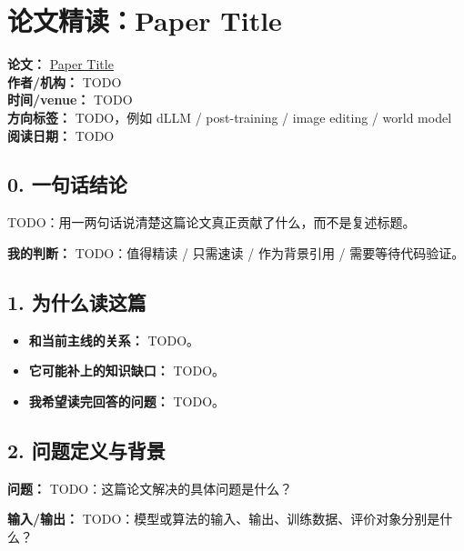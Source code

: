 
\section{论文精读：Paper Title}

\begin{conceptbox}
\textbf{论文：} \href{https://arxiv.org/abs/0000.00000}{Paper Title}\\
\textbf{作者/机构：} TODO\\
\textbf{时间/venue：} TODO\\
\textbf{方向标签：} TODO，例如 dLLM / post-training / image editing / world model\\
\textbf{阅读日期：} TODO
\end{conceptbox}

\subsection{0. 一句话结论}

TODO：用一两句话说清楚这篇论文真正贡献了什么，而不是复述标题。

\begin{summarybox}
\textbf{我的判断：} TODO：值得精读 / 只需速读 / 作为背景引用 / 需要等待代码验证。
\end{summarybox}

\subsection{1. 为什么读这篇}

\begin{itemize}[leftmargin=1.5em]
  \item \textbf{和当前主线的关系：} TODO。
  \item \textbf{它可能补上的知识缺口：} TODO。
  \item \textbf{我希望读完回答的问题：} TODO。
\end{itemize}

\subsection{2. 问题定义与背景}

\textbf{问题：} TODO：这篇论文解决的具体问题是什么？

\textbf{输入/输出：} TODO：模型或算法的输入、输出、训练数据、评价对象分别是什么？

